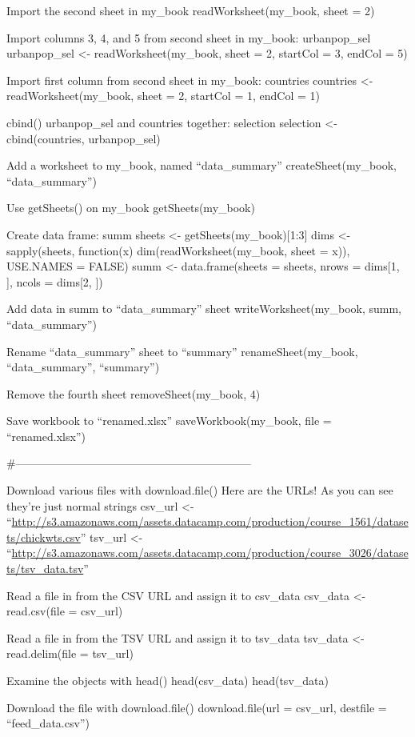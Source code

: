 \documentclass[]{book}
\begin{document}
Import the second sheet in my\_book
readWorksheet(my\_book, sheet = 2)

Import columns 3, 4, and 5 from second sheet in my\_book: urbanpop\_sel
urbanpop\_sel \textless{}- readWorksheet(my\_book, sheet = 2, startCol = 3, endCol = 5)

Import first column from second sheet in my\_book: countries
countries \textless{}- readWorksheet(my\_book, sheet = 2, startCol = 1, endCol = 1)

cbind() urbanpop\_sel and countries together: selection
selection \textless{}- cbind(countries, urbanpop\_sel)

Add a worksheet to my\_book, named ``data\_summary''
createSheet(my\_book, ``data\_summary'')

Use getSheets() on my\_book
getSheets(my\_book)

Create data frame: summ
sheets \textless{}- getSheets(my\_book){[}1:3{]}
dims \textless{}- sapply(sheets, function(x) dim(readWorksheet(my\_book, sheet = x)), USE.NAMES = FALSE)
summ \textless{}- data.frame(sheets = sheets,
nrows = dims{[}1, {]},
ncols = dims{[}2, {]})

Add data in summ to ``data\_summary'' sheet
writeWorksheet(my\_book, summ, ``data\_summary'')

Rename ``data\_summary'' sheet to ``summary''
renameSheet(my\_book, ``data\_summary'', ``summary'')

Remove the fourth sheet
removeSheet(my\_book, 4)

Save workbook to ``renamed.xlsx''
saveWorkbook(my\_book, file = ``renamed.xlsx'')

\#---------------------------------------------------------------

Download various files with download.file()
Here are the URLs! As you can see they're just normal strings
csv\_url \textless{}- ``\url{http://s3.amazonaws.com/assets.datacamp.com/production/course_1561/datasets/chickwts.csv}''
tsv\_url \textless{}- ``\url{http://s3.amazonaws.com/assets.datacamp.com/production/course_3026/datasets/tsv_data.tsv}''

Read a file in from the CSV URL and assign it to csv\_data
csv\_data \textless{}- read.csv(file = csv\_url)

Read a file in from the TSV URL and assign it to tsv\_data
tsv\_data \textless{}- read.delim(file = tsv\_url)

Examine the objects with head()
head(csv\_data)
head(tsv\_data)

Download the file with download.file()
download.file(url = csv\_url, destfile = ``feed\_data.csv'')
\end{document}
